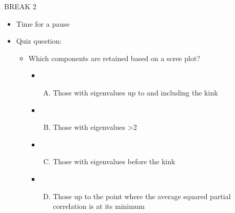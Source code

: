 \documentclass[
  ignorenonframetext,
]{beamer}
\providecommand{\tightlist}{%
  \setlength{\itemsep}{0pt}\setlength{\parskip}{0pt}}
\begin{document}
\begin{frame}{BREAK 2}
\protect\hypertarget{break-2}{}

\begin{itemize}
\tightlist
\item
  Time for a pause
\item
  Quiz question:

  \begin{itemize}
  \tightlist
  \item
    Which components are retained based on a scree plot?

    \begin{itemize}
    \item
      \begin{enumerate}
      [A)]
      \tightlist
      \item
        Those with eigenvalues up to and including the kink
      \end{enumerate}
    \item
      \begin{enumerate}
      [A)]
      \setcounter{enumi}{1}
      \tightlist
      \item
        Those with eigenvalues \textgreater2
      \end{enumerate}
    \item
      \begin{enumerate}
      [A)]
      \setcounter{enumi}{2}
      \tightlist
      \item
        Those with eigenvalues before the kink
      \end{enumerate}
    \item
      \begin{enumerate}
      [A)]
      \setcounter{enumi}{3}
      \tightlist
      \item
        Those up to the point where the average squared partial
        correlation is at its minimum
      \end{enumerate}
    \end{itemize}
  \end{itemize}
\end{itemize}

\end{frame}
\end{document}
